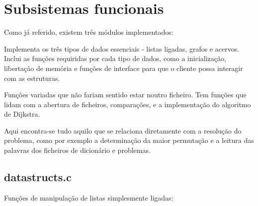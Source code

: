\documentclass[a4paper, 11pt]{article}
\begin{document}
\section{Subsistemas funcionais}
    \par Como já referido, existem três módulos implementados:
    \begin{description}[align=left]
       \item[datastructs.c] Implementa os três tipos de dados essenciais - listas ligadas, grafos e acervos. Inclui as funções requiridas por cada tipo de dados, como a inicialização, libertação de memória e funções de interface para que o cliente possa interagir com as estruturas.
       \item[utils.c] Funções variadas que não fariam sentido estar noutro ficheiro. Tem funções que lidam com a abertura de ficheiros, comparações, e a implementação do algoritmo de Dijkstra.
       \item[words.c] Aqui encontra-se tudo aquilo que se relaciona diretamente com a resolução do problema, como por exemplo a determinação da maior permutação e a leitura das palavras dos ficheiros de dicionário e problemas.
    \end{description}
    
\subsection{datastructs.c}
    \par Funções de manipulação de listas simplesmente ligadas:
\end{document}
